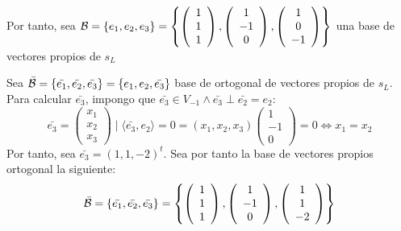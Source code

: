 \begin{ejercicio}
\begin{enumerate}
        Por tanto, sea $\mathcal{B}=\{e_1, e_2, e_3\}=\left\{
                \left(\begin{array}{c}
                     1 \\ 1 \\ 1
                \end{array}\right),
                \left(\begin{array}{c}
                     1 \\ -1 \\ 0
                \end{array} \right),
                \left(\begin{array}{c}
                     1 \\ 0 \\ -1
                \end{array} \right)\right\}$ una base de vectores propios de $s_L$

        Sea $\bar{\mathcal{B}}=\{\bar{e_1}, \bar{e_2}, \bar{e_3}\}=\left\{
                e_1, e_2, \bar{e_3}\right\}$ base de ortogonal de vectores propios de $s_L$. Para calcular $\bar{e_3}$, impongo que $\bar{e_3}\in V_{-1}\land \bar{e_3}\perp \bar{e_2}=e_2$:
        \begin{equation*}
            \bar{e_3} = \left(\begin{array}{c}
                     x_1 \\ x_2 \\ x_3
                \end{array} \right) \mid \langle\bar{e_3}, e_2\rangle=0=(x_1, x_2, x_3)\left(\begin{array}{c}
                     1 \\ -1 \\ 0
                \end{array} \right)=0 \Longleftrightarrow x_1=x_2
        \end{equation*}
        Por tanto, sea $\bar{e_3}=(1, 1, -2)^t$. Sea por tanto la base de vectores propios ortogonal la siguiente:
        \begin{equation*}
            \bar{\mathcal{B}}=\{\bar{e_1}, \bar{e_2}, \bar{e_3}\}
            = \left\{
                \left(\begin{array}{c}
                     1 \\ 1 \\ 1
                \end{array}\right),
                \left(\begin{array}{c}
                     1 \\ -1 \\ 0
                \end{array} \right),
                \left(\begin{array}{c}
                     1 \\ 1 \\ -2
                \end{array} \right)\right\}
        \end{equation*}


\end{enumerate}
\end{ejercicio}
